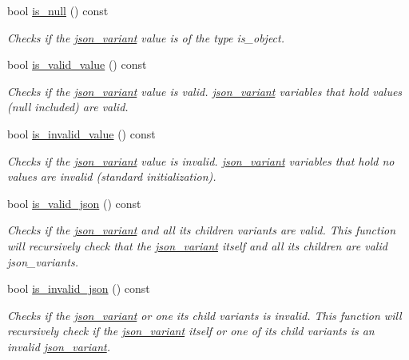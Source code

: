 \begin{DoxyCompactItemize}
bool \hyperlink{classJSONLIB__NAMESPACE_1_1json__variant_abe8f66e81c598b6a9109a65e6844c5b5}{is\+\_\+null} () const
\begin{DoxyCompactList}\small\item\em Checks if the \hyperlink{classJSONLIB__NAMESPACE_1_1json__variant}{json\+\_\+variant} value is of the type {\itshape is\+\_\+object}. \end{DoxyCompactList}\item 
bool \hyperlink{classJSONLIB__NAMESPACE_1_1json__variant_a224aab2dd56e3928dd893be8b7f3367a}{is\+\_\+valid\+\_\+value} () const
\begin{DoxyCompactList}\small\item\em Checks if the \hyperlink{classJSONLIB__NAMESPACE_1_1json__variant}{json\+\_\+variant} value is valid. \hyperlink{classJSONLIB__NAMESPACE_1_1json__variant}{json\+\_\+variant} variables that hold values (null included) are valid. \end{DoxyCompactList}\item 
bool \hyperlink{classJSONLIB__NAMESPACE_1_1json__variant_ab6552a5e3de90ab1fbca078e5c245bfb}{is\+\_\+invalid\+\_\+value} () const
\begin{DoxyCompactList}\small\item\em Checks if the \hyperlink{classJSONLIB__NAMESPACE_1_1json__variant}{json\+\_\+variant} value is invalid. \hyperlink{classJSONLIB__NAMESPACE_1_1json__variant}{json\+\_\+variant} variables that hold no values are invalid (standard initialization). \end{DoxyCompactList}\item 
bool \hyperlink{classJSONLIB__NAMESPACE_1_1json__variant_a158e3148d9256af3d1b8251b2ca7b6c4}{is\+\_\+valid\+\_\+json} () const
\begin{DoxyCompactList}\small\item\em Checks if the \hyperlink{classJSONLIB__NAMESPACE_1_1json__variant}{json\+\_\+variant} and all its children variants are valid. This function will recursively check that the \hyperlink{classJSONLIB__NAMESPACE_1_1json__variant}{json\+\_\+variant} itself and all its children are valid json\+\_\+variants. \end{DoxyCompactList}\item 
bool \hyperlink{classJSONLIB__NAMESPACE_1_1json__variant_a1a08b35da4cf3a334d32ebb81b20c08a}{is\+\_\+invalid\+\_\+json} () const
\begin{DoxyCompactList}\small\item\em Checks if the \hyperlink{classJSONLIB__NAMESPACE_1_1json__variant}{json\+\_\+variant} or one its child variants is invalid. This function will recursively check if the \hyperlink{classJSONLIB__NAMESPACE_1_1json__variant}{json\+\_\+variant} itself or one of its child variants is an invalid \hyperlink{classJSONLIB__NAMESPACE_1_1json__variant}{json\+\_\+variant}. \end{DoxyCompactList}\item 

\end{DoxyCompactItemize}
